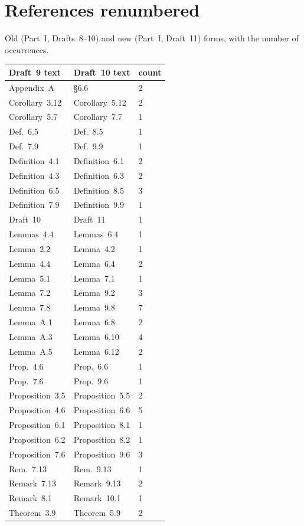 \documentclass[11pt]{article}
\begin{document}
\section*{References renumbered}
Old (Part~I, Drafts~8--10) and new (Part~I, Draft~11) forms, with the
number of occurrences.
\begin{longtable}{@{}lll@{}}\toprule Draft~9 text & Draft~10 text & count\\\midrule
Appendix~A & \S 6.6 & 2\\
Corollary~3.12 & Corollary~5.12 & 2\\
Corollary~5.7 & Corollary~7.7 & 1\\
Def.~6.5 & Def.~8.5 & 1\\
Def.~7.9 & Def.~9.9 & 1\\
Definition~4.1 & Definition~6.1 & 2\\
Definition~4.3 & Definition~6.3 & 2\\
Definition~6.5 & Definition~8.5 & 3\\
Definition~7.9 & Definition~9.9 & 1\\
Draft~10 & Draft~11 & 1\\
Lemmas~4.4 & Lemmas~6.4 & 1\\
Lemma~2.2 & Lemma~4.2 & 1\\
Lemma~4.4 & Lemma~6.4 & 2\\
Lemma~5.1 & Lemma~7.1 & 1\\
Lemma~7.2 & Lemma~9.2 & 3\\
Lemma~7.8 & Lemma~9.8 & 7\\
Lemma~A.1 & Lemma~6.8 & 2\\
Lemma~A.3 & Lemma~6.10 & 4\\
Lemma~A.5 & Lemma~6.12 & 2\\
Prop.~4.6 & Prop.~6.6 & 1\\
Prop.~7.6 & Prop.~9.6 & 1\\
Proposition~3.5 & Proposition~5.5 & 2\\
Proposition~4.6 & Proposition~6.6 & 5\\
Proposition~6.1 & Proposition~8.1 & 1\\
Proposition~6.2 & Proposition~8.2 & 1\\
Proposition~7.6 & Proposition~9.6 & 3\\
Rem.~7.13 & Rem.~9.13 & 1\\
Remark~7.13 & Remark~9.13 & 2\\
Remark~8.1 & Remark~10.1 & 1\\
Theorem~3.9 & Theorem~5.9 & 2\\

\end{longtable}
\end{document}
